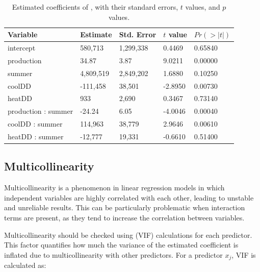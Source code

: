 \begin{table}[thbp]
\begin{tabularx}{\textwidth}{@{}lYYYY@{}}
\toprule
\parbox[t]{3.8 cm}{Variable} &
Estimate &
Std. Error &
$t$ value &
$Pr(>|t|)$ \\

\midrule
intercept           &   580,713 & 1,299,338 &  0.4469 & 0.65840 \\
production          &     34.87 &      3.87 &  9.0211 & 0.00000 \\
summer              & 4,809,519 & 2,849,202 &  1.6880 & 0.10250 \\
coolDD              &  -111,458 &    38,501 & -2.8950 & 0.00730 \\
heatDD              &       933 &     2,690 &  0.3467 & 0.73140 \\
production : summer &    -24.24 &      6.05 & -4.0046 & 0.00040 \\
coolDD : summer     &   114,963 &    38,779 &  2.9646 & 0.00610 \\
heatDD : summer     &   -12,777 &    19,331 & -0.6610 & 0.51400 \\

\bottomrule
\end{tabularx}
\caption{Estimated coefficients of , with their standard errors, $t$ values, and $p$ values.}
\label{tab:summary_mod_3}
\end{table}


\subsection{Multicollinearity} %
\label{sub:multicollinearity}

Multicollinearity is a phenomenon in linear regression models in which independent variables are highly correlated with each other, leading to unstable and unreliable results. This can be particularly problematic when interaction terms are present, as they tend to increase the correlation between variables.

Multicollinearity should be checked using  (VIF) calculations for each predictor. This factor quantifies how much the variance of the estimated coefficient is inflated due to multicollinearity with other predictors. For a predictor $x_j$, VIF is calculated as:

